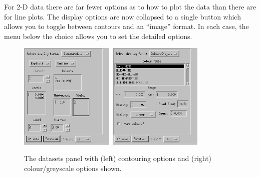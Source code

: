 \documentclass[11pt,twoside,english]{article}
\begin{document}
For 2-D data there are far fewer options as to how to plot the data
than there are for line plots. The display options are now collapsed to
a single button which allows you to toggle between contours and an
{}``image'' format.  In each case, the menu below the choice allows you
to set the detailed options.
\begin{figure}[htbp]
  \centering
  \includegraphics[width=0.4\textwidth]{main_ds_cn}~\includegraphics[width=0.4\textwidth]{main_ds_cl}
  \caption{The datasets panel with (left) contouring options and
    (right) colour/greyscale options shown.}
  \label{contour}
\end{figure}
\end{document}
